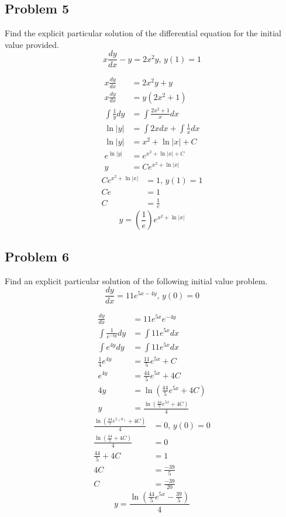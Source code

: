 \documentclass{article}
\begin{document}
\subsection{Problem 5}

Find the explicit particular solution of the differential equation for the initial value provided.
$$ x\frac{dy}{dx} - y = 2x^2y \text{, } y(1) = 1 $$

\begin{align*}
    x\frac{dy}{dx} & = 2x^2y + y \\
    x\frac{dy}{dx} & = y \left( 2x^2 + 1 \right) \\
    \int \frac{1}{y}dy & = \int \frac{2x^2 + 1}{x} dx \\
    \ln|y| & = \int 2xdx + \int \frac{1}{x}dx \\
    \ln|y| & = x^2 + \ln|x| + C \\
    e^{\ln|y|} & = e^{x^2 + \ln|x| + C} \\
    y & = Ce^{x^2 + \ln|x|}
\end{align*}
\begin{align*}
    Ce^{x^2 + \ln|x|} & = 1 \text{, } y(1) = 1 \\
    Ce & = 1 \\
    C & = \frac{1}{e}
\end{align*}
\begin{equation*}
    \boxed{y = \left( \frac{1}{e} \right) e^{x^2 + \ln|x|}}
\end{equation*}

\subsection{Problem 6}

Find an explicit particular solution of the following initial value problem.
$$ \frac{dy}{dx} = 11e^{5x-4y} \text{, } y(0) = 0 $$

\begin{align*}
    \frac{dy}{dx} & = 11e^{5x}e^{-4y} \\
    \int \frac{1}{e^{-4y}}dy & = \int 11e^{5x}dx \\
    \int e^{4y}dy & = \int 11e^{5x} dx \\
    \frac{1}{4}e^{4y} & = \frac{11}{5}e^{5x} + C \\
    e^{4y} & = \frac{44}{5}e^{5x} + 4C \\
    4y & = \ln \left( \frac{44}{5}e^{5x} + 4C \right) \\
    y & = \frac{\ln \left( \frac{44}{5}e^{5x} + 4C \right)}{4}
\end{align*}
\begin{align*}
    \frac{\ln \left( \frac{44}{5}e^{5(0)} + 4C \right)}{4} & = 0 \text{, } y(0) = 0 \\
    \frac{\ln \left( \frac{44}{5} + 4C \right)}{4} & = 0 \\
    \frac{44}{5} + 4C & = 1 \\
    4C & = \frac{-39}{5} \\
    C & = \frac{-39}{20}
\end{align*}
\begin{equation*}
    \boxed{y = \frac{\ln \left(\frac{44}{5}e^{5x} - \frac{39}{5} \right)}{4}}
\end{equation*}
\end{document}
